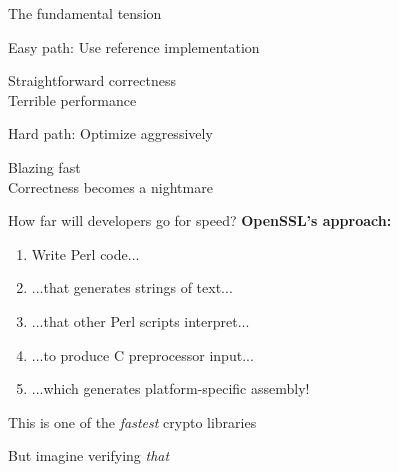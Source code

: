 \documentclass[aspectratio=169, lualatex, handout]{beamer}
\begin{document}
\begin{frame}{The fundamental tension}
	\begin{center}
		\Large
		Easy path: Use reference implementation

		\vspace{0.5em}

		\normalsize
		\mycheckmark Straightforward correctness \\
		\times Terrible performance
	\end{center}
	\vspace{1em}
	\begin{center}
		\Large
		Hard path: Optimize aggressively

		\vspace{0.5em}

		\normalsize
		\mycheckmark Blazing fast \\
		\times Correctness becomes a nightmare
	\end{center}
\end{frame}

\begin{frame}{How far will developers go for speed?}
	\textbf{OpenSSL's approach:}
	\begin{enumerate}
		\item Write Perl code...
		\item ...that generates strings of text...
		\item ...that other Perl scripts interpret...
		\item ...to produce C preprocessor input...
		\item ...which generates platform-specific assembly!
	\end{enumerate}
	\vspace{1em}
	\begin{center}
		\Large
		This is one of the \textit{fastest} crypto libraries

		\vspace{0.5em}

		\normalsize
		But imagine verifying \textit{that}
	\end{center}
\end{frame}
\end{document}

